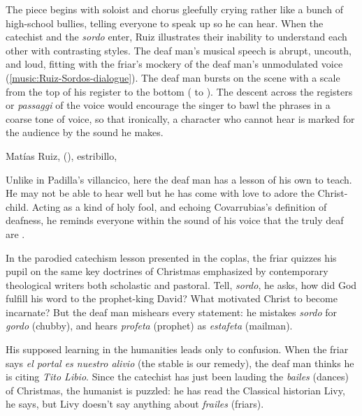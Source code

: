 The piece begins with soloist and chorus gleefully crying  rather like a bunch of high-school bullies, telling everyone to speak
up so he can hear.
When the catechist and the \emph{sordo} enter, Ruiz illustrates their inability
to understand each other with contrasting styles.
The deaf man's musical speech is abrupt, uncouth, and loud, fitting with the
friar's mockery of the deaf man's unmodulated voice
(\cref{music:Ruiz-Sordos-dialogue}).
The deaf man bursts on the scene with a scale from the top of his register to
the bottom ( to ).
The descent across the registers or \emph{passaggi} of the voice would encourage
the singer to bawl the phrases in a coarse tone of voice, so that ironically, a
character who cannot hear is marked for the audience by the sound he makes.

\begin{musicexample}
    \caption{Matías Ruiz,  (), estribillo, }

    \label{music:Ruiz-Sordos-dialogue}

\end{musicexample}

Unlike in Padilla's villancico, here the deaf man has a lesson of his own to
teach.
He may not be able to hear well but he has come with love to adore the
Christ-child.
Acting as a kind of holy fool, and echoing Covarrubias's definition of deafness,
he reminds everyone within the sound of his voice that the truly deaf are
.

In the parodied catechism lesson presented in the coplas, the friar quizzes his
pupil on the same key doctrines of Christmas emphasized by contemporary
theological writers both scholastic and pastoral.%
    \Autocite[]{Cashner:PhD} %
Tell, \emph{sordo}, he asks, how did God fulfill his word to the prophet-king
David?  What motivated Christ to become incarnate? But the deaf man mishears
every statement: he mistakes \emph{sordo} for \emph{gordo} (chubby), and hears
\emph{profeta} (prophet) as \emph{estafeta} (mailman).

His supposed learning in the humanities leads only to confusion.
When the friar says \emph{el portal es nuestro alivio} (the stable is our
remedy), the deaf man thinks he is citing \emph{Tito Libio}.
Since the catechist has just been lauding the \emph{bailes} (dances) of
Christmas, the humanist is puzzled: he has read the Classical historian Livy, he
says, but Livy doesn't say anything about \emph{frailes} (friars).

